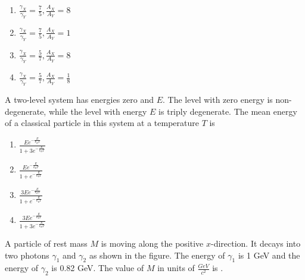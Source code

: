     \begin{enumerate}
        \item $\frac{\gamma_X}{\gamma_Y} = \frac{7}{5}, \frac{A_X}{A_Y} = 8$
        \item $\frac{\gamma_X}{\gamma_Y} = \frac{7}{5}, \frac{A_X}{A_Y} = 1$
        \item $\frac{\gamma_X}{\gamma_Y} = \frac{5}{7}, \frac{A_X}{A_Y} = 8$
        \item $\frac{\gamma_X}{\gamma_Y} = \frac{5}{7}, \frac{A_X}{A_Y} = \frac{1}{8}$
    \end{enumerate}

    \item A two-level system has energies zero and $E$. The level with zero energy is non-degenerate, while the level with energy $E$ is triply degenerate. The mean energy of a classical particle in this system at a temperature $T$ is  


    \begin{enumerate}
        \item $\frac{Ee^{-\frac{E}{k_BT}}}{1+3e^{-\frac{E}{k_BT}}}$
        \item $\frac{Ee^{-\frac{E}{k_BT}}}{1+e^{-\frac{E}{k_BT}}}$
        \item $\frac{3Ee^{-\frac{E}{k_BT}}}{1+e^{-\frac{E}{k_BT}}}$
        \item $\frac{3Ee^{-\frac{E}{k_BT}}}{1+3e^{-\frac{E}{k_BT}}}$
    \end{enumerate}

 \item A particle of rest mass $M$ is moving along the positive $x$-direction. It decays into two photons $\gamma_1$ and $\gamma_2$ as shown in the figure. The energy of $\gamma_1$ is 1 GeV and the energy of $\gamma_2$ is 0.82 GeV. The value of $M$ in units of $\frac{GeV}{{c}^2}$ is  
 \underline{\hspace{2cm}}.

\begin{figure}[!ht]
\centering
{}%

\label{fig:my_label}
\end{figure}
   

